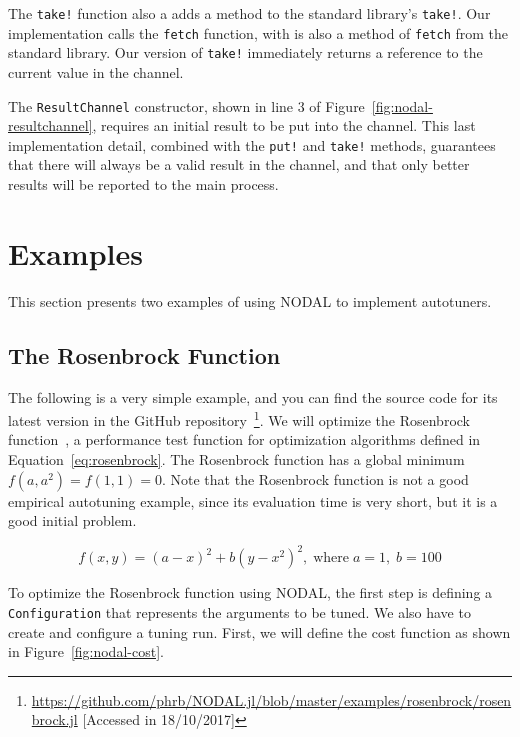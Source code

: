 The \texttt{take!} function also a adds a method to the standard library's
\texttt{take!}. Our implementation calls the \texttt{fetch} function,
with is also a method of \texttt{fetch} from the standard library. Our
version of \texttt{take!} immediately returns a reference to the
current value in the channel.

The \texttt{ResultChannel} constructor, shown in line 3 of
Figure~\ref{fig:nodal-resultchannel}, requires an initial result to be put into
the channel. This last implementation detail, combined with the \texttt{put!}
and \texttt{take!} methods, guarantees that there will always be a valid result
in the channel, and that only better results will be reported to the main
process.

\section{Examples}
\label{sec:nodal-examples}

This section presents two examples of using NODAL to implement
autotuners.

\subsection{The Rosenbrock Function}
\label{sec:nodal-rosenbrock}

The following is a very simple example, and you can find the source code for
its latest version in the GitHub
repository~\footnote{\url{https://github.com/phrb/NODAL.jl/blob/master/examples/rosenbrock/rosenbrock.jl}
[Accessed in 18/10/2017]}.
We will optimize the Rosenbrock function~\cite{rosenbrock1960automatic}, a
performance test function for optimization algorithms defined in
Equation~\ref{eq:rosenbrock}.  The Rosenbrock function has a global minimum
$f(a, a^{2}) = f(1,1) = 0$.  Note that the Rosenbrock function is not a
good empirical autotuning example, since its evaluation time is very short, but
it is a good initial problem.

\begin{equation}
    f(x, y) = (a - x)^{2} + b(y - x^{2})^{2}, \; \text{where} \; a = 1, \; b = 100
    \label{eq:rosenbrock}
\end{equation}

To optimize the Rosenbrock function using NODAL, the first step is defining a
\texttt{Configuration} that represents the arguments to be tuned. We also have
to create and configure a tuning run.  First, we will define the cost function
as shown in Figure~\ref{fig:nodal-cost}.

